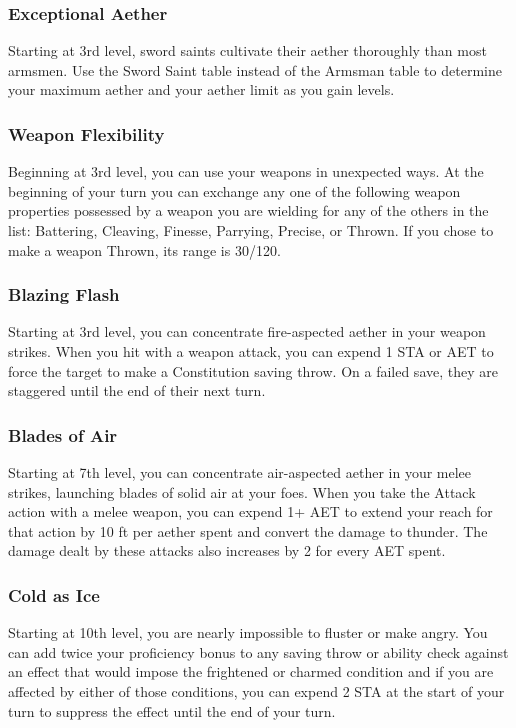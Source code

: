 \subsubsection{Exceptional Aether}
Starting at 3rd level, sword saints cultivate their aether thoroughly than most armsmen. Use the Sword Saint table instead of the Armsman table to determine your maximum aether and your aether limit as you gain levels.

\subsubsection{Weapon Flexibility}
Beginning at 3rd level, you can use your weapons in unexpected ways. At the beginning of your turn you can exchange any one of the following weapon properties possessed by a weapon you are wielding for any of the others in the list: Battering, Cleaving, Finesse, Parrying, Precise, or Thrown. If you chose to make a weapon Thrown, its range is 30/120.

\subsubsection{Blazing Flash}
Starting at 3rd level, you can concentrate fire-aspected aether in your weapon strikes. When you hit with a weapon attack, you can expend 1 STA or AET to force the target to make a Constitution saving throw. On a failed save, they are staggered until the end of their next turn.

\subsubsection{Blades of Air}
Starting at 7th level, you can concentrate air-aspected aether in your melee strikes, launching blades of solid air at your foes. When you take the Attack action with a melee weapon, you can expend 1+ AET to extend your reach for that action by 10 ft per aether spent and convert the damage to thunder. The damage dealt by these attacks also increases by 2 for every AET spent.

\subsubsection{Cold as Ice}
Starting at 10th level, you are nearly impossible to fluster or make angry. You can add twice your proficiency bonus to any saving throw or ability check against an effect that would impose the frightened or charmed condition and if you are affected by either of those conditions, you can expend 2 STA at the start of your turn to suppress the effect until the end of your turn.

